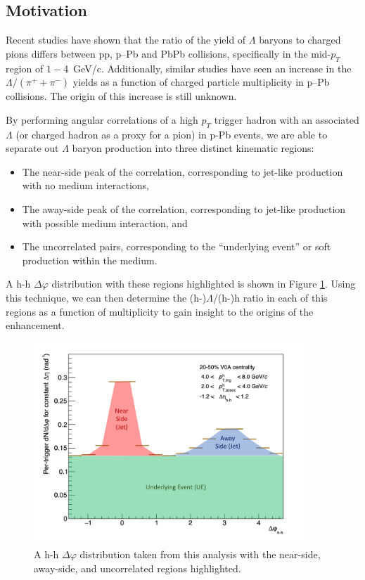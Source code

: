 \documentclass[ALICE,manyauthors]{ALICE_analysis_notes}
\begin{document}
\subsection{Motivation}
\label{motivation}
Recent studies have shown that the ratio of the yield of $\Lambda$ baryons to charged pions differs between pp, p--Pb and PbPb collisions, specifically in the mid-$p_T$ region of $1-$\SI{4}{GeV/c}.  Additionally, similar studies have seen an increase in the $\Lambda/(\pi^{+} + \pi^{-})$ yields as a function of charged particle multiplicity in p--Pb collisions. The origin of this increase is still unknown.

By performing angular correlations of a high $p_T$ trigger hadron with an associated $\Lambda$ (or charged hadron as a proxy for a pion) in p-Pb events, we are able to separate out $\Lambda$ baryon production into three distinct kinematic regions:
\begin{itemize}
\item The near-side peak of the correlation, corresponding to jet-like production with no medium interactions,
\item The away-side peak of the correlation, corresponding to jet-like production with possible medium interaction, and
\item The uncorrelated pairs, corresponding to the ``underlying event'' or soft production within the medium.
\end{itemize}

A h-h $\Delta\varphi$ distribution with these regions highlighted is shown in Figure \ref{dphi_regions}. Using this technique, we can then determine the (h-)$\Lambda$/(h-)h ratio in each of this regions as a function of multiplicity to gain insight to the origins of the enhancement.

\begin{figure}
\centering
\includegraphics[width=4in]{figures/dphi_regions.pdf}
\caption{A h-h $\Delta\varphi$ distribution taken from this analysis with the near-side, away-side, and uncorrelated regions highlighted.}
\label{dphi_regions}
\end{figure}
\end{document}
